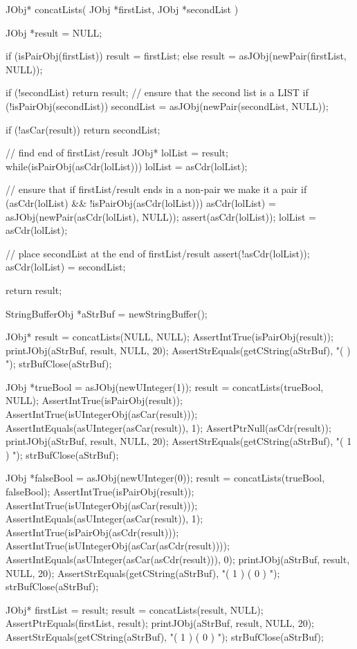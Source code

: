 \startCCode
JObj* concatLists(
  JObj *firstList,
  JObj *secondList
) {
  JObj *result = NULL;
 
  if (isPairObj(firstList)) {
    result = firstList;
  } else {
    result = asJObj(newPair(firstList, NULL));
  }
 
  if (!secondList) return result;
  // ensure that the second list is a LIST
  if (!isPairObj(secondList)) {
    secondList = asJObj(newPair(secondList, NULL));
  }

  if (!asCar(result)) return secondList;
 
  // find end of firstList/result
  JObj* lolList = result;
  while(isPairObj(asCdr(lolList))) {
    lolList = asCdr(lolList);
  }

  // ensure that if firstList/result ends in a non-pair we make it a pair
  if (asCdr(lolList) && !isPairObj(asCdr(lolList))) {
    asCdr(lolList) = asJObj(newPair(asCdr(lolList), NULL));
    assert(asCdr(lolList));
    lolList = asCdr(lolList);
  }

  // place secondList at the end of firstList/result
  assert(!asCdr(lolList));
  asCdr(lolList) = secondList;
 
  return result;
}
\stopCCode

\startCTest
  StringBufferObj *aStrBuf = newStringBuffer();
  
  JObj* result = concatLists(NULL, NULL);
  AssertIntTrue(isPairObj(result));
  printJObj(aStrBuf, result, NULL, 20);
  AssertStrEquals(getCString(aStrBuf), "(  )  ");
  strBufClose(aStrBuf);
  
  JObj *trueBool  = asJObj(newUInteger(1));
  result = concatLists(trueBool, NULL);
  AssertIntTrue(isPairObj(result));
  AssertIntTrue(isUIntegerObj(asCar(result)));
  AssertIntEquals(asUInteger(asCar(result)), 1);
  AssertPtrNull(asCdr(result));
  printJObj(aStrBuf, result, NULL, 20);
  AssertStrEquals(getCString(aStrBuf), "( 1 )  ");
  strBufClose(aStrBuf);
  
  JObj *falseBool = asJObj(newUInteger(0));
  result = concatLists(trueBool, falseBool);
  AssertIntTrue(isPairObj(result));
  AssertIntTrue(isUIntegerObj(asCar(result)));
  AssertIntEquals(asUInteger(asCar(result)), 1);
  AssertIntTrue(isPairObj(asCdr(result)));
  AssertIntTrue(isUIntegerObj(asCar(asCdr(result))));
  AssertIntEquals(asUInteger(asCar(asCdr(result))), 0);
  printJObj(aStrBuf, result, NULL, 20);
  AssertStrEquals(getCString(aStrBuf), "( 1 ) ( 0 )  ");
  strBufClose(aStrBuf);
  
  JObj* firstList = result;
  result = concatLists(result, NULL);
  AssertPtrEquals(firstList, result);
  printJObj(aStrBuf, result, NULL, 20);
  AssertStrEquals(getCString(aStrBuf), "( 1 ) ( 0 )  ");
  strBufClose(aStrBuf);
  
